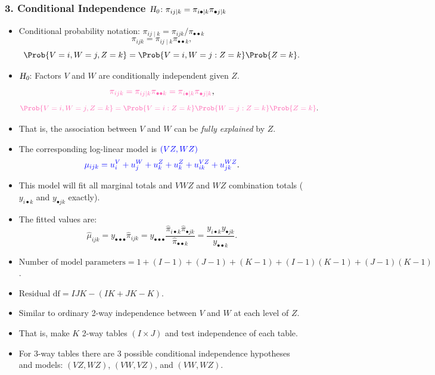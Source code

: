 \documentclass[oneside]{book}\usepackage[]{graphicx}\usepackage[svgnames]{xcolor}
\providecommand\given{} %
\renewcommand\given{\nonscript\:\delimsize\vert\nonscript\:\mathopen{}}%
\renewcommand\given{\nonscript\:\delimsize\vert\nonscript\:\mathopen{}}%
\renewcommand\given{\nonscript\:\delimsize\vert\nonscript\:\mathopen{}}%
\renewcommand\given{\nonscript\:\delimsize\vert\nonscript\:\mathopen{}}%
\renewcommand\given{\nonscript\:\delimsize\vert\nonscript\:\mathopen{}}%
\renewcommand\given{\nonscript\:\delimsize\vert\nonscript\:\mathopen{}}%
\renewcommand\given{\nonscript\:\delimsize\vert\nonscript\:\mathopen{}}%
\renewcommand\given{\nonscript\:\delimsize\vert\nonscript\:\mathopen{}}%
\renewcommand\given{\nonscript\:\delimsize\vert\nonscript\:\mathopen{}}%
\renewcommand\given{\nonscript\:\delimsize\vert\nonscript\:\mathopen{}}%
\renewcommand\given{\nonscript\:\delimsize\vert\nonscript\:\mathopen{}}%
\renewcommand\given{\nonscript\:\delimsize\vert\nonscript\:\mathopen{}}%
\let\log\relax%
\newcommand{\HN}{\textsl{H}_{\textsl{0}}}%
\renewcommand\given{:}
\begin{document}
\subsubsection*{3. Conditional Independence $ \HN\colon \pi_{ij\mid k}=\pi_{i\bullet\mid k}\pi_{\bullet j\mid k} $}
\begin{itemize}
    \item Conditional probability notation: $ \pi_{ij\mid k}=\pi_{ijk}/\pi_{\bullet\bullet k} $
          \[ \pi_{ijk}=\pi_{ij\mid k}\pi_{\bullet\bullet k}, \]
          \[ \Prob{V=i,W=j,Z=k}=\Prob{V=i,W=j\given Z=k}\Prob{Z=k}. \]
    \item $ \HN $: Factors $ V $ and $ W $ are conditionally independent given $ Z $.
          \[ \textcolor{HotPink}{
                  \pi_{ijk}=\pi_{ij\mid k}\pi_{\bullet\bullet k}=\pi_{i\bullet\mid k}\pi_{\bullet j\mid k}
              }, \]
          \[ \textcolor{HotPink}{
                  \Prob{V=i,W=j,Z=k}=\Prob{V=i\given Z=k}\Prob{W=j\given Z=k}\Prob{Z=k}
              }. \]
    \item That is, the association between $ V $ and $ W $ can be \emph{fully explained} by $ Z $.
    \item The corresponding log-linear model is $ \textcolor{Blue}{(VZ,WZ)} $
          \[ \textcolor{Blue}{\log{\mu}_{ijk}=u_i^V+u_j^W+u_k^Z+u_k^Z+u_{ik}^{VZ}+u_{jk}^{WZ}}. \]
    \item This model will fit all marginal totals and $ VWZ $ and $ WZ $ combination totals ($ y_{i\bullet k} $
          and $ y_{\bullet jk} $ exactly).
    \item The fitted values are:
          \[ \hat{\mu}_{ijk}=y_{\bullet\bullet\bullet}\hat{\pi}_{ijk}=y_{\bullet\bullet\bullet}\frac{\hat{\pi}_{i\bullet k}\hat{\pi}_{\bullet jk}}{\hat{\pi}_{\bullet\bullet k}}=\frac{y_{i\bullet k}y_{\bullet jk}}{y_{\bullet\bullet k}}. \]
    \item $ \text{Number of model parameters}=1 + (I - 1) + (J - 1) + (K - 1) + (I - 1)(K - 1) + (J - 1)(K - 1) $.
    \item $ \text{Residual df}=IJK - (IK + JK - K) $.
    \item Similar to ordinary 2-way independence between $V$ and $W$ at each level of $Z$.
    \item That is, make $K$ 2-way tables $ (I\times J) $ and test independence of each table.
    \item For 3-way tables there are 3 possible conditional independence hypotheses and
          models: $(VZ,WZ)$, $(VW,VZ)$, and $(VW,WZ)$.
\end{itemize}
\end{document}
